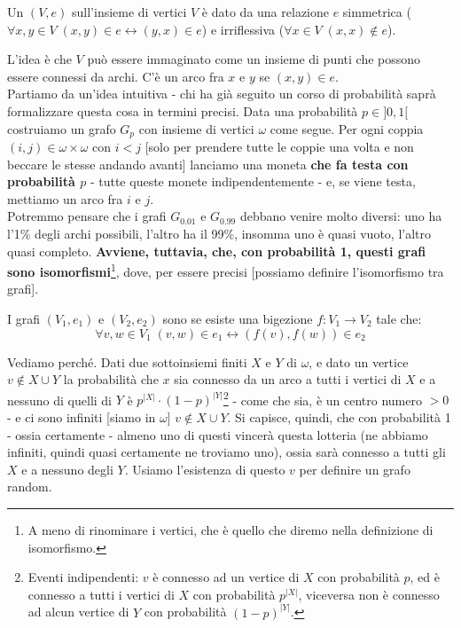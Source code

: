\documentclass[11pt]{scrartcl}
\begin{document}
\begin{definition}[Grafo]
	Un  $(V,e)$ sull'insieme di vertici $V$ è dato da una relazione $e$ simmetrica ($\forall x,y \in V \; (x,y) \in e \leftrightarrow (y,x) \in e$) e 
	irriflessiva ($\forall x \in V \; (x,x) \not\in e$).
\end{definition}

L'idea è che $V$ può essere immaginato come un insieme di punti che possono essere connessi da archi. C'è un arco fra $x$ e $y$ se $(x,y) \in e$.\\
%
Partiamo da un'idea intuitiva -  chi ha già seguito un corso di probabilità saprà formalizzare questa cosa in termini precisi. Data una probabilità $p \in ]0,1[$ costruiamo un grafo
$G_p$ con insieme di vertici $\omega$ come segue. Per ogni coppia $(i,j) \in \omega \times \omega$ con $i < j$ [solo per prendere tutte le coppie una volta e non beccare le stesse andando avanti] lanciamo una moneta \textbf{che fa testa con probabilità $p$} - tutte queste monete indipendentemente - e, se viene testa, mettiamo un arco 
fra $i$ e $j$.\\
Potremmo pensare che i grafi $G_{0.01}$ e $G_{0.99}$ debbano venire molto diversi: uno ha l'1\% degli archi possibili, l'altro ha il 99\%, insomma uno è quasi vuoto, l'altro quasi completo. \textbf{Avviene, tuttavia, che, con probabilità 1, questi grafi sono isomorfismi}\footnote{A meno di rinominare i vertici, che è quello che diremo nella definizione di isomorfismo.}, dove, per essere precisi
[possiamo definire l'isomorfismo tra grafi].

\begin{definition}
	I grafi $(V_1,e_1)$ e $(V_2,e_2)$ sono  se esiste una bigezione $f : V_1 \rightarrow V_2$ tale che:
	\[ \forall v,w \in V_1 \; (v,w) \in e_1 \longleftrightarrow (f(v),f(w)) \in e_2
		\]
\end{definition}

Vediamo perché. Dati due sottoinsiemi finiti $X$ e $Y$ di $\omega$, e dato un vertice $v \not \in X \cup Y$ la probabilità che $x$ sia connesso da un arco a tutti i vertici di $X$ e a nessuno di quelli di $Y$
è $p^{|X|} \cdot (1 - p)^{|Y|}$\footnote{Eventi indipendenti: $v$ è connesso ad un vertice di $X$ con probabilità $p$, ed è connesso a tutti i vertici di $X$ con probabilità $p^{|X|}$, viceversa non è connesso ad alcun vertice di $Y$ con
probabilità $(1-p)^{|Y|}$.} - come che sia, è un centro numero $>0$ - e ci sono infiniti [siamo in $\omega$] $v \not \in X \cup Y$. Si capisce, quindi, che con probabilità 1 - ossia certamente - almeno uno di questi vincerà questa lotteria (ne abbiamo infiniti, quindi quasi certamente ne troviamo uno), ossia sarà connesso 
a tutti gli $X$ e a nessuno degli $Y$. Usiamo l'esistenza di questo $v$ per definire un grafo random.
\end{document}
